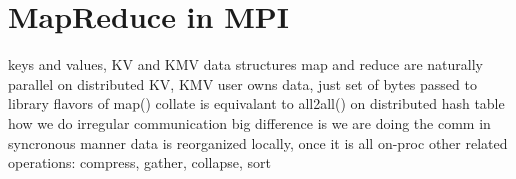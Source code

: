 \section{MapReduce in MPI}

  keys and values, KV and KMV data structures
  map and reduce are naturally parallel on distributed KV, KMV
    user owns data, just set of bytes passed to library
    flavors of map()
  collate is equivalant to all2all() on distributed hash table
    how we do irregular communication
  big difference is we are doing the comm in syncronous manner
    data is reorganized locally, once it is all on-proc
  other related operations: compress, gather, collapse, sort
